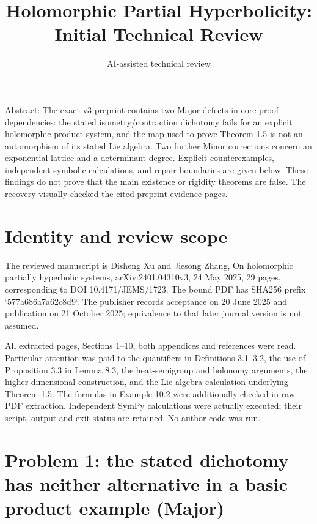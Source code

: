 \documentclass[10pt]{article}
\title{Holomorphic Partial Hyperbolicity: Initial Technical Review}
\author{AI-assisted technical review}
\date{}
\begin{document}
\maketitle
Abstract: The exact v3 preprint contains two Major defects in core proof dependencies: the stated isometry/contraction dichotomy fails for an explicit holomorphic product system, and the map used to prove Theorem 1.5 is not an automorphism of its stated Lie algebra. Two further Minor corrections concern an exponential lattice and a determinant degree. Explicit counterexamples, independent symbolic calculations, and repair boundaries are given below. These findings do not prove that the main existence or rigidity theorems are false. The recovery visually checked the cited preprint evidence pages.\par
\section*{Identity and review scope}
The reviewed manuscript is Disheng Xu and Jiesong Zhang, On holomorphic partially hyperbolic systems, arXiv:2401.04310v3, 24 May 2025, 29 pages, corresponding to DOI 10.4171/JEMS/1723. The bound PDF has SHA256 prefix `577a686a7a62c8d9`. The publisher records acceptance on 20 June 2025 and publication on 21 October 2025; equivalence to that later journal version is not assumed.\par
All extracted pages, Sections 1–10, both appendices and references were read. Particular attention was paid to the quantifiers in Definitions 3.1–3.2, the use of Proposition 3.3 in Lemma 8.3, the heat-semigroup and holonomy arguments, the higher-dimensional construction, and the Lie algebra calculation underlying Theorem 1.5. The formulas in Example 10.2 were additionally checked in raw PDF extraction. Independent SymPy calculations were actually executed; their script, output and exit status are retained. No author code was run.\par
\section*{Problem 1: the stated dichotomy has neither alternative in a basic product example (Major)}
\end{document}
